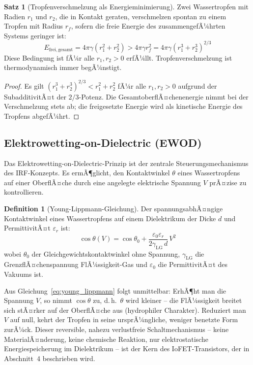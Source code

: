 ﻿\documentclass[a4paper,12pt]{scrreprt}
\theoremstyle{definition}
\newtheorem{definition}{Definition}[section]
\newtheorem{satz}{Satz}[section]
\begin{document}
\begin{satz}[Tropfenverschmelzung als Energieminimierung]
	Zwei Wassertropfen mit Radien $r_1$ und $r_2$, die in Kontakt geraten,
	verschmelzen spontan zu einem Tropfen mit Radius $r_f$, sofern die freie
	Energie des zusammengefÃ¼hrten Systems geringer ist:
	\begin{equation}
		E_{\mathrm{frei, gesamt}} = 4\pi\gamma(r_1^2 + r_2^2) > 4\pi\gamma r_f^2
		= 4\pi\gamma(r_1^3 + r_2^3)^{2/3}
		\label{eq:energieminimierung}
	\end{equation}
	Diese Bedingung ist fÃ¼r alle $r_1, r_2 > 0$ erfÃ¼llt. Tropfenverschmelzung
	ist thermodynamisch immer begÃ¼nstigt.
\end{satz}

\begin{proof}
	Es gilt $(r_1^3 + r_2^3)^{2/3} < r_1^2 + r_2^2$ fÃ¼r alle $r_1, r_2 > 0$
	aufgrund der SubadditivitÃ¤t der $2/3$-Potenz. Die GesamtoberflÃ¤chenenergie
	nimmt bei der Verschmelzung stets ab; die freigesetzte Energie wird als
	kinetische Energie des Tropfens abgefÃ¼hrt.
\end{proof}

\subsection{Elektrowetting-on-Dielectric (EWOD)}

Das Elektrowetting-on-Dielectric-Prinzip ist der zentrale Steuerungsmechanismus
des IRF-Konzepts. Es ermÃ¶glicht, den Kontaktwinkel $\theta$ eines Wassertropfens
auf einer OberflÃ¤che durch eine angelegte elektrische Spannung $V$ prÃ¤zise
zu kontrollieren.

\begin{definition}[Young-Lippmann-Gleichung]
	Der spannungsabhÃ¤ngige Kontaktwinkel eines Wassertropfens auf einem
	Dielektrikum der Dicke $d$ und PermittivitÃ¤t $\varepsilon_r$ ist:
	\begin{equation}
		\cos\theta(V) = \cos\theta_0 + \frac{\varepsilon_0 \varepsilon_r}{2\gamma_{\mathrm{LG}}\, d}\, V^2
		\label{eq:young_lippmann}
	\end{equation}
	wobei $\theta_0$ der Gleichgewichtskontaktwinkel ohne Spannung,
	$\gamma_{\mathrm{LG}}$ die GrenzflÃ¤chenspannung FlÃ¼ssigkeit-Gas und $\varepsilon_0$
	die PermittivitÃ¤t des Vakuums ist.
\end{definition}

Aus Gleichung~\eqref{eq:young_lippmann} folgt unmittelbar: ErhÃ¶ht man die
Spannung $V$, so nimmt $\cos\theta$ zu, d.\,h.\ $\theta$ wird kleiner -- die
FlÃ¼ssigkeit breitet sich stÃ¤rker auf der OberflÃ¤che aus (hydrophiler Charakter).
Reduziert man $V$ auf null, kehrt der Tropfen in seine ursprÃ¼ngliche, weniger
benetzte Form zurÃ¼ck. Dieser reversible, nahezu verlustfreie
Schaltmechanismus -- keine MaterialÃ¤nderung, keine chemische Reaktion,
nur elektrostatische Energiespeicherung im Dielektrikum -- ist der
Kern des IoFET-Transistors, der in Abschnitt~4 beschrieben wird.
\end{document}

